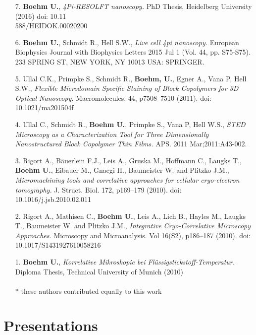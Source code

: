 \documentclass[margin,line]{res}
\begin{document}
\begin{resume}
\begin{enumerate}[leftmargin=*]
\item[7.] {\bf Boehm U.},  {\it 4Pi-RESOLFT nanoscopy.} PhD Thesis, Heidelberg University (2016) doi: 10.11\\588/HEIDOK.00020200

\item[6.] {\bf Boehm U.}, Schmidt R., Hell S.W., {\it Live cell 4pi nanoscopy.} European Biophysics Journal with Biophysics Letters 2015 Jul 1 (Vol. 44, pp. S75-S75). 233 SPRING ST, NEW YORK, NY 10013 USA: SPRINGER.

\item[5.] Ullal C.K., Primpke S., Schmidt R., {\bf Boehm, U.}, Egner A., Vana P, Hell S.W., {\it Flexible Microdomain Specific Staining of Block Copolymers for 3D Optical Nanoscopy.} Macromolecules, 44, p7508–7510 (2011). doi: 10.1021/ma201504f

\item[4.] Ullal C., Schmidt R., {\bf  Boehm U.}, Primpke S., Vana P, Hell W.S.,  {\it STED Microscopy as a Characterization Tool for Three Dimensionally Nanostructured Block Copolymer Thin Films.} APS. 2011 Mar;2011:A43-002.

\item[3.] Rigort A., Bäuerlein F.J., Leis A., Gruska M., Hoffmann C., Laugks T., {\bf Boehm U.}, Eibauer M., Gnaegi H., Baumeister W. and Plitzko J.M.,  {\it Micromachining tools and correlative approaches for cellular cryo-electron tomography.} J. Struct. Biol. 172, p169–179 (2010). doi: 10.1016/j.jsb.2010.02.011

\item[2.] Rigort A., Mathisen C., {\bf Boehm U.}, Leis A., Lich B., Hayles M., Laugks T., Baumeister W. and Plitzko J.M.,  {\it Integrative Cryo-Correlative Microscopy Approaches.}
Microscopy and Microanalysis. Vol 16(S2), p186–187 (2010). doi: 10.1017/S1431927610058216 

\item[1.]{\bf Boehm U.},  {\it Korrelative Mikroskopie bei Flüssigstickstoff-Temperatur.} Diploma Thesis, Technical University of Munich (2010)  \\ \\
$*$ these authors contributed equally to this work

\end{enumerate}


\section{\sc  Presentations}


\end{resume}
\end{document}
